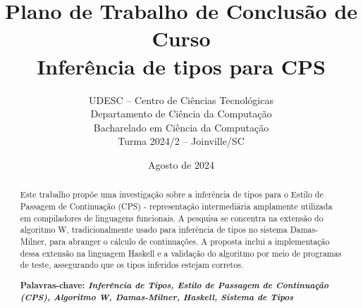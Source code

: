 \documentclass[12pt]{article}
\begin{document}
\pagestyle{fancy}



\title{Plano de Trabalho de Conclusão de Curso\\
	Inferência de tipos para CPS}

\onehalfspacing

\author{UDESC -- Centro de Ciências Tecnológicas\\
	Departamento de Ciência da Computação\\
	Bacharelado em Ciência da Computação\\
	Turma 2024/2 -- Joinville/SC
}


\date{Agosto de 2024}
\maketitle

\onehalfspacing

\begin{abstract}
	\vskip 0.5cm
	Este trabalho propõe uma investigação sobre a inferência de tipos para o Estilo de Passagem de Continuação (CPS) - representação intermediária amplamente utilizada em compiladores de linguagens funcionais.
	A pesquisa se concentra na extensão do algoritmo W, tradicionalmente usado para inferência de tipos no sistema Damas-Milner, para abranger o cálculo de continuações.
	A proposta inclui a implementação dessa extensão na linguagem Haskell e a validação do algoritmo por meio de programas de teste, assegurando que os tipos inferidos estejam corretos.

	\noindent\textbf{Palavras-chave: \textit{Inferência de Tipos, Estilo de Passagem de Continuação (CPS), Algoritmo W, Damas-Milner, Haskell, Sistema de Tipos}}
\end{abstract}
\end{document}
